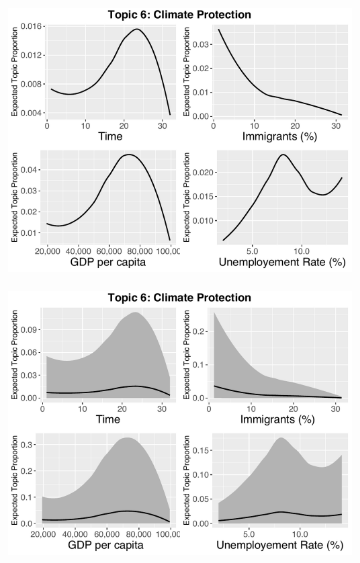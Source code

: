 \begin{figure}[h!]
    \centering
     \captionsetup{justification=centering,margin=2cm}
  \begin{subfigure}[b]{0.3\linewidth}
    \includegraphics[width=\linewidth]{../plots/4_4/direct_t6_without_credible.pdf}
  \end{subfigure}
  \begin{subfigure}[b]{0.3\linewidth}
    \includegraphics[width=\linewidth]{../plots/4_4/direct_t6_with_credible.pdf}
  \end{subfigure}
  \begin{subfigure}[b]{0.3\linewidth}

\end{subfigure}
\end{figure}
